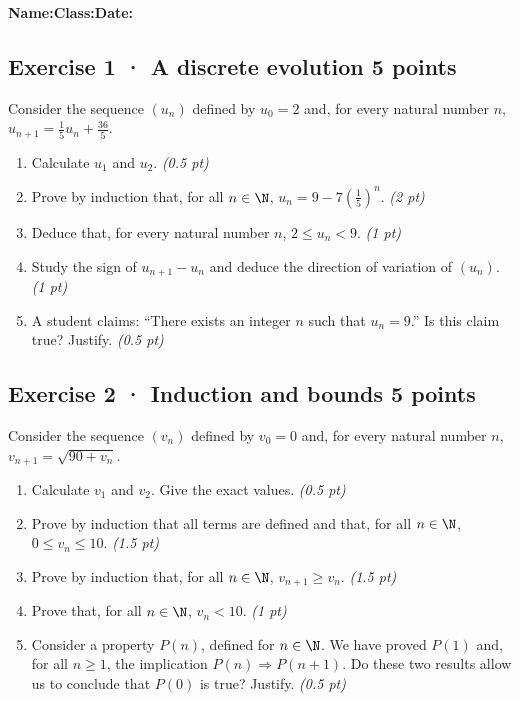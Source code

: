 \smallskip\textbf{Name:}\enspace\dotfill\quad\textbf{Class:}\enspace\dotfill\quad\textbf{Date:}\enspace\dotfill

\subsection*{Exercise 1 · A discrete evolution \hfill 5 points}Consider the sequence $(u_n)$ defined by $u_0=2$ and, for every natural number $n$, $u_{n+1}=\frac{1}{5}u_n+\frac{36}{5}$.

\begin{enumerate}

\item Calculate $u_1$ and $u_2$. \hfill\textit{(0.5 pt)}

\item Prove by induction that, for all $n\in\N$, $u_n=9-7\left(\frac{1}{5}\right)^n$. \hfill\textit{(2 pt)}

\item Deduce that, for every natural number $n$, $2\le u_n<9$. \hfill\textit{(1 pt)}

\item Study the sign of $u_{n+1}-u_n$ and deduce the direction of variation of $(u_n)$. \hfill\textit{(1 pt)}

\item A student claims: ``There exists an integer $n$ such that $u_n=9$.'' Is this claim true? Justify. \hfill\textit{(0.5 pt)}

\end{enumerate}

\subsection*{Exercise 2 · Induction and bounds \hfill 5 points}Consider the sequence $(v_n)$ defined by $v_0=0$ and, for every natural number $n$, $v_{n+1}=\sqrt{90+v_n}$.

\begin{enumerate}

\item Calculate $v_1$ and $v_2$. Give the exact values. \hfill\textit{(0.5 pt)}

\item Prove by induction that all terms are defined and that, for all $n\in\N$, $0\le v_n\le10$. \hfill\textit{(1.5 pt)}

\item Prove by induction that, for all $n\in\N$, $v_{n+1}\ge v_n$. \hfill\textit{(1.5 pt)}

\item Prove that, for all $n\in\N$, $v_n<10$. \hfill\textit{(1 pt)}

\item Consider a property $P(n)$, defined for $n\in\N$. We have proved $P(1)$ and, for all $n\ge1$, the implication $P(n)\Rightarrow P(n+1)$. Do these two results allow us to conclude that $P(0)$ is true? Justify. \hfill\textit{(0.5 pt)}

\end{enumerate}

